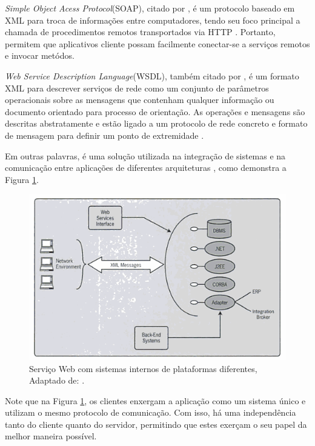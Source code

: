 \textit{Simple Object Acess Protocol}(SOAP), citado por \cite{w3c}, é um protocolo baseado em XML para troca de informações entre computadores, tendo seu foco principal a chamada de procedimentos remotos transportados via HTTP \cite{ethan}. Portanto, permitem que aplicativos cliente possam facilmente conectar-se a serviços remotos e invocar metódos. 

\textit{Web Service Description Language}(WSDL), também citado por \cite{w3c}, é um formato XML para descrever serviços de rede como um conjunto de parâmetros operacionais sobre as mensagens que contenham qualquer informação ou documento orientado para processo de orientação. As operações e mensagens são descritas abstratamente e estão ligado a um protocolo de rede concreto e formato de mensagem para definir um ponto de extremidade \cite{wsdl}.

Em outras palavras, é uma solução utilizada na integração de sistemas e na comunicação entre aplicações de diferentes arquiteturas \cite{book:webservice}, como demonstra a Figura \ref{imagem:webservice}.

\begin{figure}[ht]
 \centering
 \includegraphics[scale=0.80,bb=0 0 450 250]{webservice_exemplo.png}
 \caption{Serviço Web com sistemas internos de plataformas diferentes, Adaptado de: \cite{webservice_foto}.}
\label{imagem:webservice}
\end{figure}

Note que na Figura \ref{imagem:webservice}, os clientes enxergam a aplicação como um sistema único e utilizam o mesmo protocolo de comunicação. Com isso, há uma independência tanto do cliente quanto do servidor, permitindo que estes exerçam o seu papel da melhor maneira possível.

